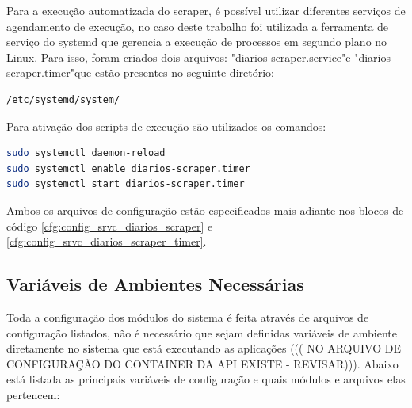 Para a execução automatizada do scraper, é possível utilizar diferentes serviços de agendamento de execução, no caso deste trabalho foi utilizada a ferramenta de serviço do systemd que gerencia a execução de processos em segundo plano no Linux. Para isso, foram criados dois arquivos: "diarios-scraper.service"\space e "diarios-scraper.timer"\space que estão presentes no seguinte diretório:
\begin{lstlisting}[caption={}, label={dir:scraper_systemd_dir}, language=bash]
/etc/systemd/system/
\end{lstlisting}\noindent
Para ativação dos scripts de execução são utilizados os comandos:

\begin{lstlisting}[caption={}, label={sh:scraper_systemd_sh}, language=bash]
sudo systemctl daemon-reload
sudo systemctl enable diarios-scraper.timer
sudo systemctl start diarios-scraper.timer
\end{lstlisting}\noindent

Ambos os arquivos de configuração estão especificados mais adiante nos blocos de código \ref{cfg:config_srvc_diarios_scraper} e \ref{cfg:config_srvc_diarios_scraper_timer}.

\subsection{Variáveis de Ambientes Necessárias}

 Toda a configuração dos módulos do sistema é feita através de arquivos de configuração listados, não é necessário que sejam definidas variáveis de ambiente diretamente no sistema que está executando as aplicações ((( NO ARQUIVO DE CONFIGURAÇÃO DO CONTAINER DA API EXISTE - REVISAR))). Abaixo está listada as principais variáveis de configuração e quais módulos e arquivos elas pertencem:
 
